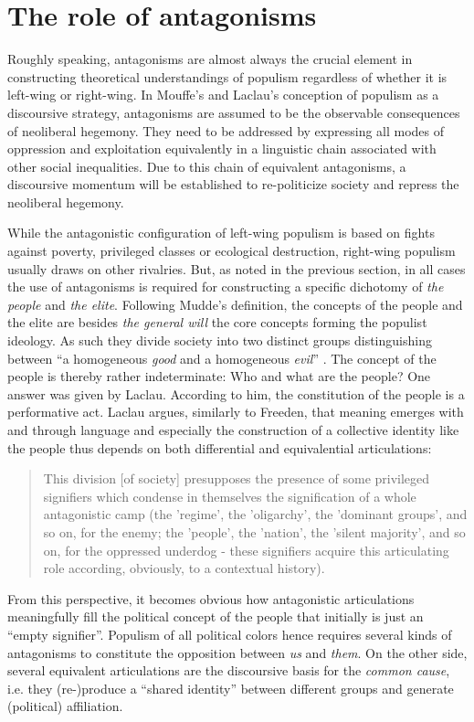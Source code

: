 \documentclass[a4paper]{scrreprt}
\begin{document}
\section{The role of antagonisms}
Roughly speaking, antagonisms are almost always the crucial element in constructing theoretical understandings of populism regardless of whether it is left-wing or right-wing. In Mouffe's and Laclau's conception of populism as a discoursive strategy, antagonisms are assumed to be the observable consequences of neoliberal hegemony. They need to be addressed by expressing all modes of oppression and exploitation equivalently in a linguistic chain associated with other social inequalities. Due to this chain of equivalent antagonisms, a discoursive momentum will be established to re-politicize society and repress the neoliberal hegemony. \cite[p.~135]{laclaumouffe:2001}\par
While the antagonistic configuration of left-wing populism is based on fights against poverty, privileged classes or ecological destruction, right-wing populism usually draws on other rivalries. But, as noted in the previous section, in all cases the use of antagonisms is required for constructing a specific dichotomy of {\em the people} and {\em the elite}. Following Mudde's definition, the concepts of the people and the elite are besides {\em the general will} the core concepts forming the populist ideology. As such they divide society into two distinct groups distinguishing between ``a homogeneous {\em good} and a homogeneous {\em evil}'' \cite[p.~7]{mudde:2017}. The concept of the people is thereby rather indeterminate: Who and what are the people? One answer was given by Laclau. According to him, the constitution of the people is a performative act. Laclau argues, similarly to Freeden, that meaning emerges with and through language and especially the construction of a collective identity like the people thus depends on both differential and equivalential articulations:
\begin{quote}
    This division [of society] presupposes the presence of some privileged signifiers which condense in themselves the signification of a whole antagonistic camp (the 'regime', the 'oligarchy', the 'dominant groups', and so on, for the enemy; the 'people', the 'nation', the 'silent majority', and so on, for the oppressed underdog - these signifiers acquire this articulating role according, obviously, to a contextual history). \cite[p.~87]{laclau:2005}
\end{quote}
From this perspective, it becomes obvious how antagonistic articulations meaningfully fill the political concept of the people that initially is just an ``empty signifier''. \cite[p.~72]{laclau:2005} Populism of all political colors hence requires several kinds of antagonisms to constitute the opposition between {\em us} and {\em them}. On the other side, several equivalent articulations are the discoursive basis for the {\em common cause}, i.e. they (re-)produce a ``shared identity'' between different groups and generate (political) affiliation. \cite[p.~9]{mudde:2017}
\end{document}
